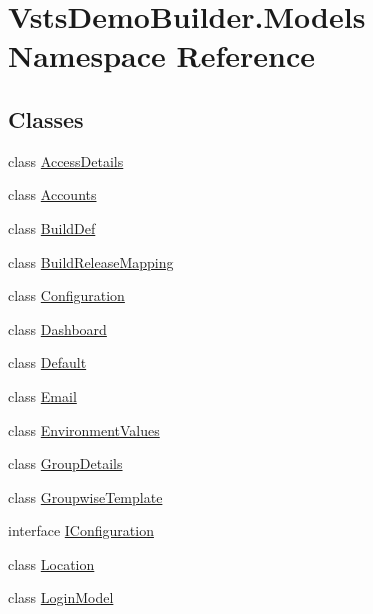 \hypertarget{namespace_vsts_demo_builder_1_1_models}{}\section{Vsts\+Demo\+Builder.\+Models Namespace Reference}
\label{namespace_vsts_demo_builder_1_1_models}
\subsection*{Classes}
\begin{DoxyCompactItemize}
\item 
class \mbox{\hyperlink{class_vsts_demo_builder_1_1_models_1_1_access_details}{Access\+Details}}
\item 
class \mbox{\hyperlink{class_vsts_demo_builder_1_1_models_1_1_accounts}{Accounts}}
\item 
class \mbox{\hyperlink{class_vsts_demo_builder_1_1_models_1_1_build_def}{Build\+Def}}
\item 
class \mbox{\hyperlink{class_vsts_demo_builder_1_1_models_1_1_build_release_mapping}{Build\+Release\+Mapping}}
\item 
class \mbox{\hyperlink{class_vsts_demo_builder_1_1_models_1_1_configuration}{Configuration}}
\item 
class \mbox{\hyperlink{class_vsts_demo_builder_1_1_models_1_1_dashboard}{Dashboard}}
\item 
class \mbox{\hyperlink{class_vsts_demo_builder_1_1_models_1_1_default}{Default}}
\item 
class \mbox{\hyperlink{class_vsts_demo_builder_1_1_models_1_1_email}{Email}}
\item 
class \mbox{\hyperlink{class_vsts_demo_builder_1_1_models_1_1_environment_values}{Environment\+Values}}
\item 
class \mbox{\hyperlink{class_vsts_demo_builder_1_1_models_1_1_group_details}{Group\+Details}}
\item 
class \mbox{\hyperlink{class_vsts_demo_builder_1_1_models_1_1_groupwise_template}{Groupwise\+Template}}
\item 
interface \mbox{\hyperlink{interface_vsts_demo_builder_1_1_models_1_1_i_configuration}{I\+Configuration}}
\item 
class \mbox{\hyperlink{class_vsts_demo_builder_1_1_models_1_1_location}{Location}}
\item 
class \mbox{\hyperlink{class_vsts_demo_builder_1_1_models_1_1_login_model}{Login\+Model}}
\item 

\end{DoxyCompactItemize}
